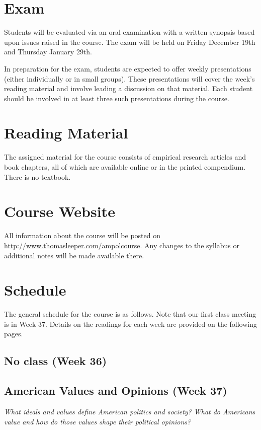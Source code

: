 \documentclass[12pt,a4paper]{article}
\begin{document}
\section{Exam}
Students will be evaluated via an oral examination with a written synopsis based upon issues raised in the course. The exam will be held on Friday December 19th and Thursday January 29th.

In preparation for the exam, students are expected to offer weekly presentations (either individually or in small groups). These presentations will cover the week's reading material and involve leading a discussion on that material. Each student should be involved in at least three such presentations during the course.

\section{Reading Material}
The assigned material for the course consists of empirical research articles and book chapters, all of which are available online or in the printed compendium. There is no textbook.

\section{Course Website}
All information about the course will be posted on \url{http://www.thomasleeper.com/ampolcourse}. Any changes to the syllabus or additional notes will be made available there.

\clearpage
\section{Schedule}
The general schedule for the course is as follows. Note that our first class meeting is in Week 37. Details on the readings for each week are provided on the following pages.

\secttoc

\clearpage


\subsection{No class (Week 36)}

\clearpage
\subsection{American Values and Opinions (Week 37)}
\emph{What ideals and values define American politics and society? What do Americans value and how do those values shape their political opinions?}
\vspace{1em}
\end{document}
